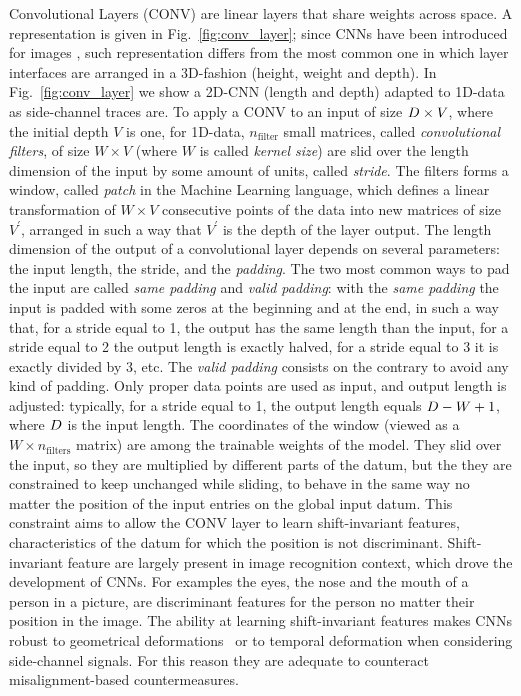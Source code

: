 Convolutional Layers (CONV) are linear layers that share weights across space. A representation is given in Fig.~\ref{fig:conv_layer}; since CNNs have been introduced for images \cite{lecun1995convolutional}, such representation differs from the most common one in which layer interfaces are arranged in a 3D-fashion (height, weight and depth). In Fig.~\ref{fig:conv_layer} we show a 2D-CNN (length and depth) adapted to 1D-data as side-channel traces are. To apply a CONV to an input of size $D\times V$, where the initial depth $V$ is one, for 1D-data,
$n_{\text{filter}}$ small matrices, called \emph{convolutional filters}, of
size $W\times V$ (where $W$ is called \emph{kernel size}) are slid over 
the length dimension of the input by some amount of units, called \emph{stride}. 
The filters forms a window, called \emph{patch} in the Machine Learning language, which defines a
linear transformation of $W\times V$ consecutive points of the data into new
matrices of size $V^{\prime}$, arranged in such a way that $V^{\prime}$ is the depth of the layer output. The length dimension of the output of a convolutional layer depends on several parameters: the input length, the stride, and the \emph{padding}. The two most common ways to pad the input are called \emph{same padding} and \emph{valid padding}: with the \emph{same padding} the input is padded with some zeros at the beginning and at the end, in such a way that, for a stride equal to 1, the output has the same
length than the input, for a stride equal to 2 the output length is exactly halved, for a stride equal to 3 it is exactly divided by 3, etc.  The \emph{valid padding} consists on the contrary to avoid any kind of padding. Only proper data points are used as input, and output length is adjusted: typically, for a stride equal to 1, the output length equals $D - W +1$, where $D$ is the input length. The
coordinates of the window (viewed as a $W\times n_{\text{filters}}$ matrix) are among the trainable weights of the model. They slid over the input, so they are multiplied by different parts of the datum, but the they are constrained to keep unchanged while sliding, \ie to behave in the same way no matter the position of the input entries on the global input datum. This constraint aims to allow the CONV layer to
learn shift-invariant features, \ie characteristics of the datum for which the position is not discriminant. Shift-invariant feature are largely present in image recognition context, which drove the development of CNNs. For examples the eyes, the nose and the mouth of a person in a picture, are discriminant features for the person no matter their position in the image. The ability at learning shift-invariant features makes CNNs robust to
geometrical deformations~\cite{lecun1995convolutional} or to temporal deformation when considering side-channel signals. For this reason they are adequate to counteract misalignment-based countermeasures.


